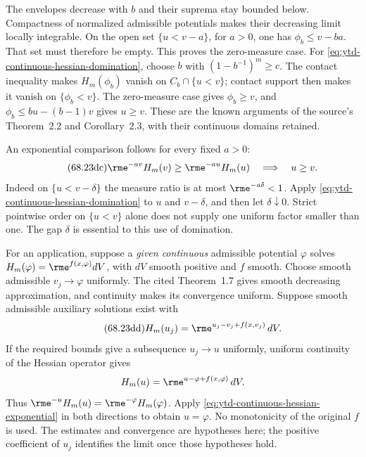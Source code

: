 The envelopes decrease with $b$ and their suprema stay bounded
below. Compactness of normalized admissible potentials makes
their decreasing limit locally integrable. On the open set
$\{u<v-a\}$, for $a>0$, one has $\phi_b\leq v-ba$.
That set must therefore be empty. This proves the zero-measure
case. For \eqref{eq:ytd-continuous-hessian-domination}, choose $b$
with $(1-b^{-1})^m\geq c$. The contact inequality makes
$H_m(\phi_b)$ vanish on $C_b\cap\{u<v\}$; contact support then
makes it vanish on $\{\phi_b<v\}$. The zero-measure case gives
$\phi_b\geq v$, and $\phi_b\leq bu-(b-1)v$ gives $u\geq v$.
These are the known arguments of the source's Theorem~2.2 and
Corollary~2.3, with their continuous domains retained.

An exponential comparison follows for every fixed $a>0$:
\[
\tag{68.23dc}\label{eq:ytd-continuous-hessian-exponential}
 \rme^{-av}H_m(v)\geq\rme^{-au}H_m(u)
       \quad\Longrightarrow\quad u\geq v.
\]
Indeed on $\{u<v-\delta\}$ the measure ratio is at most
$\rme^{-a\delta}<1$. Apply
\eqref{eq:ytd-continuous-hessian-domination} to $u$ and
$v-\delta$, and then let $\delta\downarrow0$. Strict pointwise
order on $\{u<v\}$ alone does not supply one uniform factor
smaller than one. The gap $\delta$ is essential to this use of
domination.

For an application, suppose a \emph{given continuous} admissible
potential $\varphi$ solves $H_m(\varphi)=\rme^{f(x,\varphi)}dV$,
with $dV$ smooth positive and $f$ smooth. Choose smooth admissible
$v_j\to\varphi$ uniformly. The cited Theorem~1.7 gives smooth
decreasing approximation, and continuity makes its convergence
uniform. Suppose smooth admissible auxiliary solutions exist with
\[
\tag{68.23dd}\label{eq:ytd-continuous-hessian-auxiliary}
 H_m(u_j)=\rme^{u_j-v_j+f(x,v_j)}\,dV.
\]
If the required bounds give a subsequence $u_j\to u$ uniformly,
uniform continuity of the Hessian operator gives
\[
 H_m(u)=\rme^{u-\varphi+f(x,\varphi)}\,dV.
\]
Thus $\rme^{-u}H_m(u)=\rme^{-\varphi}H_m(\varphi)$.
Apply \eqref{eq:ytd-continuous-hessian-exponential} in both
directions to obtain $u=\varphi$. No monotonicity of the original
$f$ is used. The estimates and convergence are hypotheses here;
the positive coefficient of $u_j$ identifies the limit once those
hypotheses hold.

